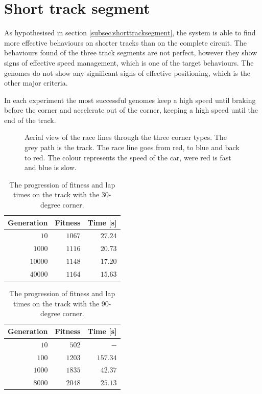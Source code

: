 \section{Short track segment}
\label{result:short}
As hypothesised in section \ref{subsec:shorttracksegment}, the system is able to find more effective behaviours on shorter tracks than on the complete circuit. The behaviours found of the three track segments are not perfect, however they show signs of effective speed management, which is one of the target behaviours. The genomes do not show any significant signs of effective positioning, which is the other major criteria. 

In each experiment the most successful genomes keep a high speed until braking before the corner and accelerate out of the corner, keeping a high speed until the end of the track. 

\begin{figure}[H]
    \centering
    \qquad
    \qquad

    \caption{Aerial view of the race lines through the three corner types. The grey path is the track. The race line goes from red, to blue and back to red. The colour represents the speed of the car, were red is fast and blue is slow.}
\end{figure}

\begin{table}[H] 
  \centering
  \begin{tabular}{|r|r|r|}
    \toprule
    Generation & Fitness & Time [s]\\
    \midrule
    $10$    & $1067$     & $27.24$       \\
    $1000$   & $1116$    & $20.73$  \\
    $10000$  & $1148$    & $17.20$   \\
    $40000$  & $1164$    & $15.63$   \\
    \bottomrule
  \end{tabular}
  \caption{The progression of fitness and lap times on the track with the 30-degree corner.}
  \label{tab:30deg}
\end{table}


\begin{table}[H] 
  \centering
  \begin{tabular}{|r|r|r|}
    \toprule
    Generation & Fitness & Time [s]\\
    \midrule
    $10$    & $502$     & $-$       \\
    $100$   & $1203$    & $157.34$  \\
    $1000$  & $1835$    & $42.37$   \\
    $8000$  & $2048$    & $25.13$   \\
    \bottomrule
  \end{tabular}
  \caption{The progression of fitness and lap times on the track with the 90-degree corner.}
  \label{tab:90deg}
\end{table}

